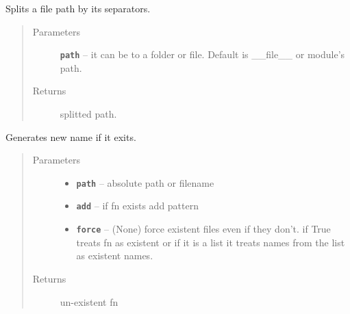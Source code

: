 \documentclass[letterpaper,10pt,english]{sphinxmanual}
\begin{document}

\begin{fulllineitems}
\label{RRtoolbox.lib:RRtoolbox.lib.directory.getSplitted}
Splits a file path by its separators.
\begin{quote}\begin{description}
\item[{Parameters}] \leavevmode
\textbf{\texttt{path}} -- it can be to a folder or file. Default is \_\_file\_\_ or module's path.

\item[{Returns}] \leavevmode
splitted path.

\end{description}\end{quote}

\end{fulllineitems}


\begin{fulllineitems}
\label{RRtoolbox.lib:RRtoolbox.lib.directory.increment_if_exits}
Generates new name if it exits.
\begin{quote}\begin{description}
\item[{Parameters}] \leavevmode\begin{itemize}
\item {} 
\textbf{\texttt{path}} -- absolute path or filename

\item {} 
\textbf{\texttt{add}} -- if fn exists add pattern

\item {} 
\textbf{\texttt{force}} -- (None) force existent files even if they don't. if True
treats fn as existent or if it is a list it treats names from
the list as existent names.

\end{itemize}

\item[{Returns}] \leavevmode
un-existent fn

\end{description}\end{quote}

\end{fulllineitems}
\end{document}
